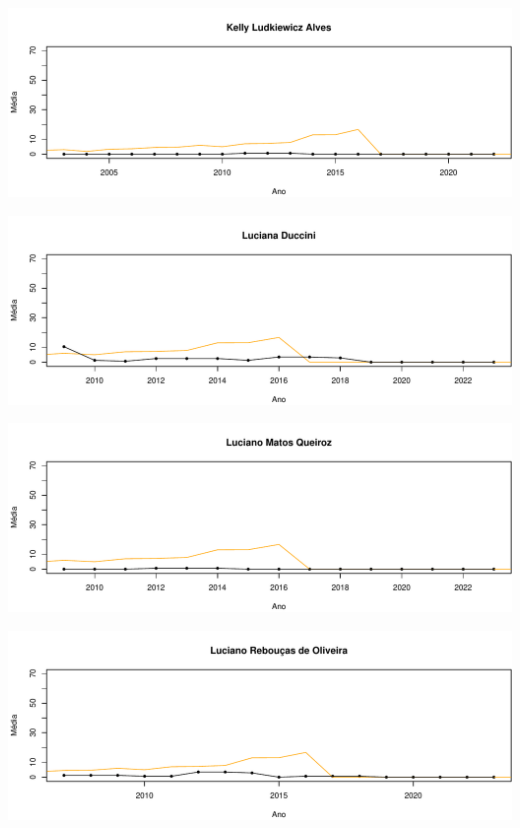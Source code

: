 \documentclass[12pt,brazil]{article}\usepackage[]{graphicx}\usepackage[]{xcolor}
\makeatletter
\def\maxwidth{ %
  \ifdim\Gin@nat@width>\linewidth
    \linewidth
  \else
    \Gin@nat@width
  \fi
}
\makeatother
\begin{document}
\vspace{0.5cm}


{\centering \includegraphics[width=\maxwidth]{figure/mediamovel-39} 

}



\vspace{0.5cm}


{\centering \includegraphics[width=\maxwidth]{figure/mediamovel-40} 

}



\vspace{0.5cm}


{\centering \includegraphics[width=\maxwidth]{figure/mediamovel-41} 

}



\vspace{0.5cm}


{\centering \includegraphics[width=\maxwidth]{figure/mediamovel-42} 

}
\end{document}
